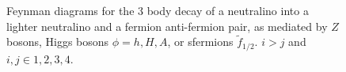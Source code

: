 \documentclass[final,3p,times]{elsarticle}
\begin{document}
\begin{figure}
  \caption{Feynman diagrams for the 3 body decay of a neutralino into a lighter neutralino and a fermion anti-fermion pair, as mediated by $Z$ bosons, Higgs bosons $\phi = h,H,A$, or sfermions $\tilde{f}_{1/2}$. $i>j$ and ${i,j}\in{1,2,3,4}$.} \label{neutneutffbardiag}
\end{figure} 
\end{document}
